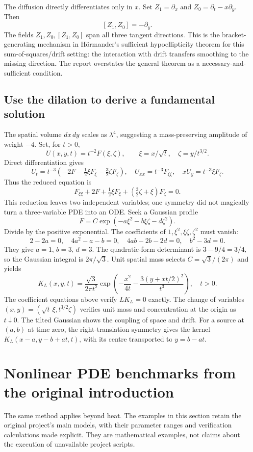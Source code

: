 \documentclass[11pt,a4paper]{article}
\numberwithin{equation}{section}
\theoremstyle{definition}
\theoremstyle{plain}
\theoremstyle{remark}
\begin{document}
The diffusion directly differentiates only in $x$. Set $Z_1=\partial_x$ and $Z_0=\partial_t-x\partial_y$. Then
\[
[Z_1,Z_0]=-\partial_y.
\]
The fields $Z_1,Z_0,[Z_1,Z_0]$ span all three tangent directions. This is the bracket-generating mechanism in H\"ormander's sufficient hypoellipticity theorem for this sum-of-squares/drift setting: the interaction with drift transfers smoothing to the missing direction. The report overstates the general theorem as a necessary-and-sufficient condition.

\subsection{Use the dilation to derive a fundamental solution}
The spatial volume $dx\,dy$ scales as $\lambda^4$, suggesting a mass-preserving amplitude of weight $-4$. Set, for $t>0$,
\[
U(x,y,t)=t^{-2}F(\xi,\zeta),\qquad \xi=x/\sqrt t,\quad\zeta=y/t^{3/2}.
\]
Direct differentiation gives
\[
U_t=t^{-3}(-2F-\tfrac12\xi F_\xi-\tfrac32\zeta F_\zeta),\quad
U_{xx}=t^{-3}F_{\xi\xi},\quad xU_y=t^{-3}\xi F_\zeta.
\]
Thus the reduced equation is
\[
F_{\xi\xi}+2F+\tfrac12\xi F_\xi+(\tfrac32\zeta+\xi)F_\zeta=0.
\]
This reduction leaves two independent variables; one symmetry did not magically turn a three-variable PDE into an ODE. Seek a Gaussian profile
\[
F=C\exp(-a\xi^2-b\xi\zeta-d\zeta^2).
\]
Divide by the positive exponential. The coefficients of $1,\xi^2,\xi\zeta,\zeta^2$ must vanish:
\[
2-2a=0,\quad4a^2-a-b=0,\quad4ab-2b-2d=0,\quad b^2-3d=0.
\]
They give $a=1$, $b=3$, $d=3$. The quadratic-form determinant is $3-9/4=3/4$, so the Gaussian integral is $2\pi/\sqrt3$. Unit spatial mass selects $C=\sqrt3/(2\pi)$ and yields
\begin{equation}\label{eq:kol-kernel}
\boxed{K_L(x,y,t)=\frac{\sqrt3}{2\pi t^2}
\exp\left(-\frac{x^2}{4t}-\frac{3(y+xt/2)^2}{t^3}\right),\quad t>0.}
\end{equation}
The coefficient equations above verify $LK_L=0$ exactly. The change of variables $(x,y)=(\sqrt t\,\xi,t^{3/2}\zeta)$ verifies unit mass and concentration at the origin as $t\downarrow0$. The tilted Gaussian shows the coupling of space and drift. For a source at $(a,b)$ at time zero, the right-translation symmetry gives the kernel $K_L(x-a,y-b+at,t)$, with its centre transported to $y=b-at$.

\section{Nonlinear PDE benchmarks from the original introduction}\label{sec:benchmarks}
The same method applies beyond heat. The examples in this section retain the original project's main models, with their parameter ranges and verification calculations made explicit. They are mathematical examples, not claims about the execution of unavailable project scripts.
\end{document}
